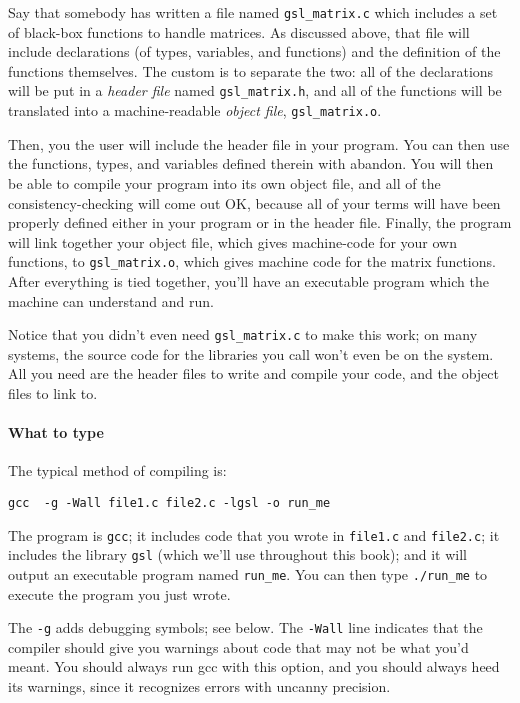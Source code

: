 \documentclass[12pt]{article}
\def\ind#1{\index{#1}#1}
\begin{document}
Say that somebody has written a file named {\tt gsl\_matrix.c} which
includes a set of black-box functions to handle matrices.
As discussed above,
that file will include declarations (of types, variables, and functions)
and the definition of the functions themselves. The custom is to separate
the two: all of the declarations will be put in a {\sl \ind{header file}}
named {\tt gsl\_matrix.h}, and all of the functions will be translated
into a machine-readable {\sl \ind{object file}}, {\tt gsl\_matrix.o}.

Then, you the user will include the header file in your program. You can then
use the functions, types, and variables defined therein with abandon.
You will then be able to compile your program into its own object file,
and all of the consistency-checking will come out OK, because all of your
terms will have been properly defined either in your program or in the
header file. Finally, the program will link together your object file,
which gives machine-code for your own functions, to {\tt gsl\_matrix.o},
which gives machine code for the matrix functions. After everything is
tied together, you'll have an executable program which the machine can
understand and run.

Notice that you didn't even need {\tt gsl\_matrix.c} to make this work;
on many systems, the source code for the libraries you call
won't even be on the system. All you need are the 
header files to write and compile your code, and the
object files to link to.



\paragraph{What to type}
The typical method of compiling is:

\begin{verbatim}
gcc  -g -Wall file1.c file2.c -lgsl -o run_me
\end{verbatim}

The program is {\tt gcc}; it includes code that you wrote in {\tt file1.c} and {\tt file2.c}; it
includes the library {\tt gsl} (which we'll use throughout this book); and it will output an executable
program named {\tt run\_me}. You can then type {\tt ./run\_me} to execute the program you just wrote. 

The {\tt -g} adds \ind{debugging} symbols; see below.  The {\tt -Wall} line
indicates that the compiler should give you warnings about code that
may not be what you'd meant. You should always run gcc with this option,
and you should always heed its warnings, since it recognizes errors with
uncanny precision.
\end{document}
